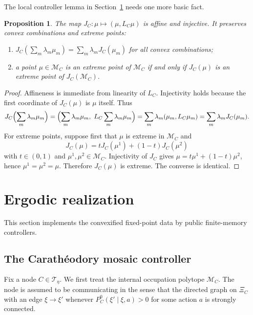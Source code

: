 \documentclass[12pt]{article}
\newtheorem{proposition}[theorem]{Proposition}
\theoremstyle{definition}
\newcommand{\1}{\mathbf{1}}
\newcommand{\cM}{\mathcal{M}}
\newcommand{\cT}{\mathcal{T}}
\begin{document}
The local controller lemma in Section~\ref{sec:realization} needs one more basic fact.

\begin{proposition}
\label{prop:JC-extreme}
The map \(J_C:\mu\mapsto (\mu,L_C\mu)\) is affine and injective.  It preserves convex
combinations and extreme points:
\begin{enumerate}[label=\textnormal{(\roman*)},leftmargin=2.6em]
\item \(J_C(\sum_m \lambda_m\mu_m)=\sum_m \lambda_m J_C(\mu_m)\) for all convex
combinations;
\item a point \(\mu\in \cM_C\) is an extreme point of \(\cM_C\) if and only if \(J_C(\mu)\)
is an extreme point of \(J_C(\cM_C)\).
\end{enumerate}
\end{proposition}

\begin{proof}
Affineness is immediate from linearity of \(L_C\).  Injectivity holds because the first
coordinate of \(J_C(\mu)\) is \(\mu\) itself.  Thus
\[
J_C\Bigl(\sum_m \lambda_m\mu_m\Bigr)
=
\Bigl(\sum_m \lambda_m\mu_m,\ L_C\sum_m \lambda_m\mu_m\Bigr)
=
\sum_m \lambda_m(\mu_m,L_C\mu_m)
=
\sum_m \lambda_m J_C(\mu_m).
\]
For extreme points, suppose first that \(\mu\) is extreme in \(\cM_C\) and
\[
J_C(\mu)=tJ_C(\mu^1)+(1-t)J_C(\mu^2)
\]
with \(t\in(0,1)\) and \(\mu^1,\mu^2\in \cM_C\).  Injectivity of \(J_C\) gives
\(\mu=t\mu^1+(1-t)\mu^2\), hence \(\mu^1=\mu^2=\mu\).  Therefore \(J_C(\mu)\) is
extreme.  The converse is identical.
\end{proof}

\section{Ergodic realization}
\label{sec:realization}

This section implements the convexified fixed-point data by public finite-memory
controllers.

\subsection{The Carath\'eodory mosaic controller}
\label{subsec:mosaic}

Fix a node \(C\in \cT_\eta\).  We first treat the internal occupation polytope
\(\cM_C\).  The node is assumed to be communicating in the sense that the directed graph
on \(\Xi_C\) with an edge \(\xi\to \xi'\) whenever
\(P_C^0(\xi'\mid \xi,a)>0\) for some action \(a\) is strongly connected.
\end{document}
